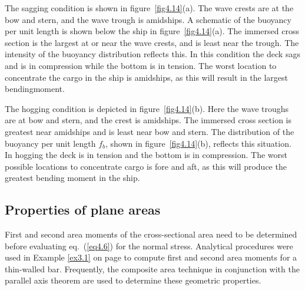 \documentclass{AeroStructure-ERJohnson}
\begin{document}
The sagging condition is shown in figure~\ref{fig4.14}(a). The wave crests are at the bow and stern, and the wave trough is amidships. A schematic of the buoyancy per unit length is shown below the ship in figure~\ref{fig4.14}(a). The immersed cross section is the largest at or near the wave crests, and is least near the trough. The intensity of the buoyancy distribution reflects this. In this condition the deck sags and is in compression while the bottom is in tension. The worst location to concentrate the cargo in the ship is amidships, as this will result in the largest bending\break moment.\pagebreak

{\def\thefigure{4.14}
}


The hogging condition is depicted in figure~\ref{fig4.14}(b). Here the wave troughs are at bow and stern, and the crest is amidships. The immersed cross section is greatest near amidships and is least near bow and stern. The distribution of the buoyancy per unit length $f_{b}$, shown in figure~\ref{fig4.14}(b), reflects this situation. In hogging the deck is in tension and the bottom is in compression. The worst possible locations to concentrate cargo is fore and aft, as this will produce the greatest bending moment in the ship.


\subsection{Properties of plane areas}\label{sec4.3.3}

First and second area moments of the cross-sectional area need to be determined before evaluating eq.~(\ref{eq4.6}) for the normal stress. Analytical procedures were used in Example \ref{ex3.1} on page \pageref{ex3.1} to compute first and second area moments for a thin-walled bar. Frequently, the composite area technique in conjunction with the parallel axis theorem are used to determine these geometric properties.
\end{document}
